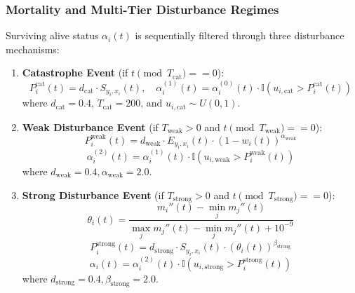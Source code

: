 \documentclass[11pt,a4paper]{article}
\begin{document}
\subsubsection{Mortality and Multi-Tier Disturbance Regimes}
Surviving alive status $\alpha_i(t)$ is sequentially filtered through three disturbance mechanisms:
\begin{enumerate}
    \item \textbf{Catastrophe Event} (if $t \pmod{T_{\text{cat}}} == 0$):
    \begin{equation}
    P_i^{\text{cat}}(t) = d_{\text{cat}} \cdot S_{y_i, x_i}(t), \quad \alpha_i^{(1)}(t) = \alpha_i^{(0)}(t) \cdot \mathbb{I}\left(u_{i, \text{cat}} > P_i^{\text{cat}}(t)\right)
    \end{equation}
    where $d_{\text{cat}} = 0.4$, $T_{\text{cat}} = 200$, and $u_{i,\text{cat}} \sim U(0,1)$.
    
    \item \textbf{Weak Disturbance Event} (if $T_{\text{weak}} > 0$ and $t \pmod{T_{\text{weak}}} == 0$):
    \begin{equation}
    P_i^{\text{weak}}(t) = d_{\text{weak}} \cdot E_{y_i, x_i}(t) \cdot \left(1 - w_i(t)\right)^{\alpha_{\text{weak}}}
    \end{equation}
    \begin{equation}
    \alpha_i^{(2)}(t) = \alpha_i^{(1)}(t) \cdot \mathbb{I}\left(u_{i, \text{weak}} > P_i^{\text{weak}}(t)\right)
    \end{equation}
    where $d_{\text{weak}} = 0.4, \alpha_{\text{weak}} = 2.0$.
    
    \item \textbf{Strong Disturbance Event} (if $T_{\text{strong}} > 0$ and $t \pmod{T_{\text{strong}}} == 0$):
    \begin{equation}
    \theta_i(t) = \frac{m_i''(t) - \min_j m_j''(t)}{\max_j m_j''(t) - \min_j m_j''(t) + 10^{-9}}
    \end{equation}
    \begin{equation}
    P_i^{\text{strong}}(t) = d_{\text{strong}} \cdot S_{y_i, x_i}(t) \cdot \left(\theta_i(t)\right)^{\beta_{\text{strong}}}
    \end{equation}
    \begin{equation}
    \alpha_i(t) = \alpha_i^{(2)}(t) \cdot \mathbb{I}\left(u_{i, \text{strong}} > P_i^{\text{strong}}(t)\right)
    \end{equation}
    where $d_{\text{strong}} = 0.4, \beta_{\text{strong}} = 2.0$.
\end{enumerate}
\end{document}
